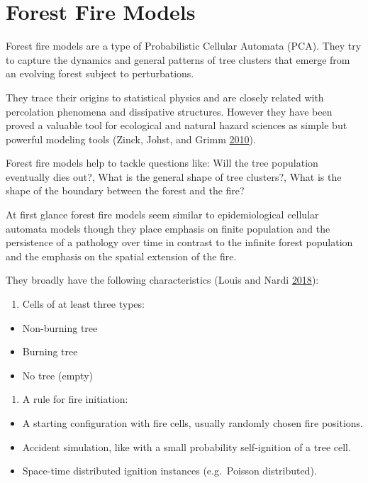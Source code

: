 \documentclass[
  openany]{book}
\providecommand{\tightlist}{%
  \setlength{\itemsep}{0pt}\setlength{\parskip}{0pt}}
\begin{document}
\hypertarget{forest-fire-models}{%
\section{Forest Fire Models}\label{forest-fire-models}}

Forest fire models are a type of Probabilistic Cellular Automata (PCA). They try to capture the dynamics and general patterns of tree clusters that emerge from an evolving forest subject to perturbations.

They trace their origins to statistical physics and are closely related with percolation phenomena and dissipative structures. However they have been proved a valuable tool for ecological and natural hazard sciences as simple but powerful modeling tools (Zinck, Johst, and Grimm \protect\hyperlink{ref-zinck2010wildfire}{2010}).

Forest fire models help to tackle questions like: Will the tree population eventually dies out?, What is the general shape of tree clusters?, What is the shape of the boundary between the forest and the fire?

At first glance forest fire models seem similar to epidemiological cellular automata models though they place emphasis on finite population and the persistence of a pathology over time in contrast to the infinite forest population and the emphasis on the spatial extension of the fire.

They broadly have the following characteristics (Louis and Nardi \protect\hyperlink{ref-louis2018probabilistic}{2018}):

\begin{enumerate}
\def\labelenumi{\arabic{enumi}.}
\tightlist
\item
  Cells of at least three types:
\end{enumerate}

\begin{itemize}
\tightlist
\item
  Non-burning tree
\item
  Burning tree
\item
  No tree (empty)
\end{itemize}

\begin{enumerate}
\def\labelenumi{\arabic{enumi}.}
\setcounter{enumi}{1}
\tightlist
\item
  A rule for fire initiation:
\end{enumerate}

\begin{itemize}
\tightlist
\item
  A starting configuration with fire cells, usually randomly chosen fire positions.
\item
  Accident simulation, like with a small probability self-ignition of a tree cell.
\item
  Space-time distributed ignition instances (e.g.~Poisson distributed).
\end{itemize}
\end{document}
